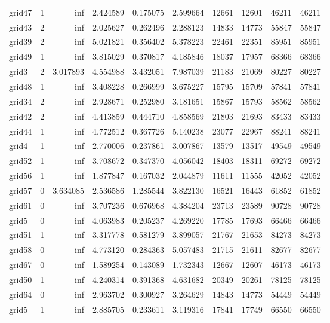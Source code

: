 \begin{longtable}{|l|r|r|r|r|r|r|r|r|r|}
grid47 & 1 & inf & 2.424589 & 0.175075 & 2.599664 & 12661 & 12601 & 46211 & 46211 \\
grid43 & 2 & inf & 2.025627 & 0.262496 & 2.288123 & 14833 & 14773 & 55847 & 55847 \\
grid39 & 2 & inf & 5.021821 & 0.356402 & 5.378223 & 22461 & 22351 & 85951 & 85951 \\
grid49 & 1 & inf & 3.815029 & 0.370817 & 4.185846 & 18037 & 17957 & 68366 & 68366 \\
grid3 & 2 & 3.017893 & 4.554988 & 3.432051 & 7.987039 & 21183 & 21069 & 80227 & 80227 \\
grid48 & 1 & inf & 3.408228 & 0.266999 & 3.675227 & 15795 & 15709 & 57841 & 57841 \\
grid34 & 2 & inf & 2.928671 & 0.252980 & 3.181651 & 15867 & 15793 & 58562 & 58562 \\
grid42 & 2 & inf & 4.413859 & 0.444710 & 4.858569 & 21803 & 21693 & 83433 & 83433 \\
grid44 & 1 & inf & 4.772512 & 0.367726 & 5.140238 & 23077 & 22967 & 88241 & 88241 \\
grid4 & 1 & inf & 2.770006 & 0.237861 & 3.007867 & 13579 & 13517 & 49549 & 49549 \\
grid52 & 1 & inf & 3.708672 & 0.347370 & 4.056042 & 18403 & 18311 & 69272 & 69272 \\
grid56 & 1 & inf & 1.877847 & 0.167032 & 2.044879 & 11611 & 11555 & 42052 & 42052 \\
grid57 & 0 & 3.634085 & 2.536586 & 1.285544 & 3.822130 & 16521 & 16443 & 61852 & 61852 \\
grid61 & 0 & inf & 3.707236 & 0.676968 & 4.384204 & 23713 & 23589 & 90728 & 90728 \\
grid5 & 0 & inf & 4.063983 & 0.205237 & 4.269220 & 17785 & 17693 & 66466 & 66466 \\
grid51 & 1 & inf & 3.317778 & 0.581279 & 3.899057 & 21767 & 21653 & 84273 & 84273 \\
grid58 & 0 & inf & 4.773120 & 0.284363 & 5.057483 & 21715 & 21611 & 82677 & 82677 \\
grid67 & 0 & inf & 1.589254 & 0.143089 & 1.732343 & 12667 & 12607 & 46173 & 46173 \\
grid50 & 1 & inf & 4.240314 & 0.391368 & 4.631682 & 20349 & 20261 & 78125 & 78125 \\
grid64 & 0 & inf & 2.963702 & 0.300927 & 3.264629 & 14843 & 14773 & 54449 & 54449 \\
grid5 & 1 & inf & 2.885705 & 0.233611 & 3.119316 & 17841 & 17749 & 66550 & 66550 \\

\end{longtable}
